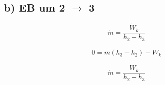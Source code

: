 \subsection*{b) EB um 2 $\rightarrow$ 3}

\[
\dot{m} = \frac{\dot{W}_k}{h_2 - h_3}
\]

\[
0 = \dot{m} (h_3 - h_2) - \dot{W}_k
\]

\[
\dot{m} = \frac{\dot{W}_k}{h_2 - h_3}
\]